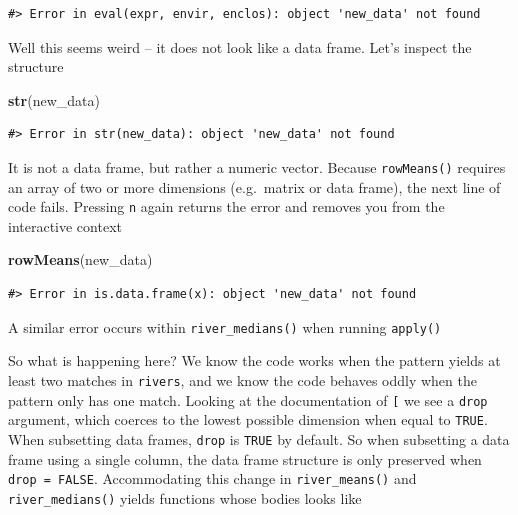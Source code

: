 \documentclass[
]{book}
\newenvironment{Shaded}{\begin{snugshade}}{\end{snugshade}}
\newcommand{\KeywordTok}[1]{\textcolor[rgb]{0.13,0.29,0.53}{\textbf{#1}}}
\newcommand{\NormalTok}[1]{#1}
\begin{document}
\begin{verbatim}
#> Error in eval(expr, envir, enclos): object 'new_data' not found
\end{verbatim}

Well this seems weird -- it does not look like a data frame. Let's inspect the structure

\begin{Shaded}
\begin{Highlighting}[]
\KeywordTok{str}\NormalTok{(new_data)}
\end{Highlighting}
\end{Shaded}

\begin{verbatim}
#> Error in str(new_data): object 'new_data' not found
\end{verbatim}

It is not a data frame, but rather a numeric vector. Because \texttt{rowMeans()} requires an array of two or more dimensions (e.g.~matrix or data frame), the next line of code fails. Pressing \texttt{n} again returns the error and removes you from the interactive context

\begin{Shaded}
\begin{Highlighting}[]
\KeywordTok{rowMeans}\NormalTok{(new_data)}
\end{Highlighting}
\end{Shaded}

\begin{verbatim}
#> Error in is.data.frame(x): object 'new_data' not found
\end{verbatim}

A similar error occurs within \texttt{river\_medians()} when running \texttt{apply()}

So what is happening here? We know the code works when the pattern yields at least two matches in \texttt{rivers}, and we know the code behaves oddly when the pattern only has one match. Looking at the documentation of \texttt{{[}} we see a \texttt{drop} argument, which coerces to the lowest possible dimension when equal to \texttt{TRUE}. When subsetting data frames, \texttt{drop} is \texttt{TRUE} by default. So when subsetting a data frame using a single column, the data frame structure is only preserved when \texttt{drop\ =\ FALSE}. Accommodating this change in \texttt{river\_means()} and \texttt{river\_medians()} yields functions whose bodies looks like
\end{document}
